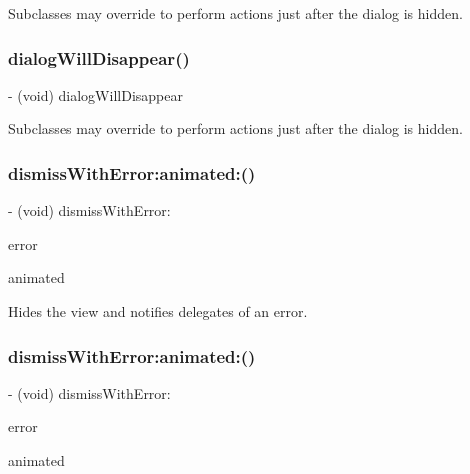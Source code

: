 Subclasses may override to perform actions just after the dialog is hidden. \mbox{\label{interfaceFBDialog_a0aaf0151353b93b543525601f9d41a83}} 
\subsubsection{\texorpdfstring{dialog\+Will\+Disappear()}{dialogWillDisappear()}\hspace{0.1cm}{\footnotesize\ttfamily [2/2]}}
{\footnotesize\ttfamily -\/ (void) dialog\+Will\+Disappear \begin{DoxyParamCaption}{ }\end{DoxyParamCaption}}

Subclasses may override to perform actions just after the dialog is hidden. \mbox{\label{interfaceFBDialog_a88519295b89d9f78791bf316a34af3e1}} 
\subsubsection{\texorpdfstring{dismiss\+With\+Error\+:animated\+:()}{dismissWithError:animated:()}\hspace{0.1cm}{\footnotesize\ttfamily [1/2]}}
{\footnotesize\ttfamily -\/ (void) dismiss\+With\+Error\+: \begin{DoxyParamCaption}\item[{(N\+S\+Error $\ast$)}]{error }\item[{animated:(B\+O\+OL)}]{animated }\end{DoxyParamCaption}}

Hides the view and notifies delegates of an error. \mbox{\label{interfaceFBDialog_a88519295b89d9f78791bf316a34af3e1}} 
\subsubsection{\texorpdfstring{dismiss\+With\+Error\+:animated\+:()}{dismissWithError:animated:()}\hspace{0.1cm}{\footnotesize\ttfamily [2/2]}}
{\footnotesize\ttfamily -\/ (void) dismiss\+With\+Error\+: \begin{DoxyParamCaption}\item[{(N\+S\+Error $\ast$)}]{error }\item[{animated:(B\+O\+OL)}]{animated }\end{DoxyParamCaption}}

